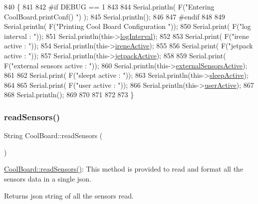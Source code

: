 \begin{DoxyCode}
840 \{
841 
842 \textcolor{preprocessor}{#if DEBUG == 1}
843     
844     Serial.println( F(\textcolor{stringliteral}{"Entering CoolBoard.printConf() "}) );
845     Serial.println();
846 
847 \textcolor{preprocessor}{#endif}
848 
849     Serial.println( F(\textcolor{stringliteral}{"Printing Cool Board Configuration "}));
850     Serial.print( F(\textcolor{stringliteral}{"log interval       : "}));
851     Serial.println(this->\hyperlink{class_cool_board_a84bc94413b64973e4aba8c467c97006c}{logInterval});
852 
853     Serial.print( F(\textcolor{stringliteral}{"irene active       : "}));
854     Serial.println(this->\hyperlink{class_cool_board_a9c3f7ac625481ee2ae802a25d97a4ae0}{ireneActive});
855 
856     Serial.print( F(\textcolor{stringliteral}{"jetpack active     : "}));
857     Serial.println(this->\hyperlink{class_cool_board_a9be03a913d26e558328935ca3b59a75e}{jetpackActive});
858 
859     Serial.print( F(\textcolor{stringliteral}{"external sensors active    : "}));
860     Serial.println(this->\hyperlink{class_cool_board_a638b00b76aeb819ecfd4c10b8cdd7bb7}{externalSensorsActive});
861 
862     Serial.print( F(\textcolor{stringliteral}{"sleept active      : "}));
863     Serial.println(this->\hyperlink{class_cool_board_a0a51b2287139f66c738101fb53139230}{sleepActive});
864 
865     Serial.print( F(\textcolor{stringliteral}{"user active        : "}));
866     Serial.println(this->\hyperlink{class_cool_board_a6395459131d6889a3005f79c7a35e964}{userActive});
867 
868     Serial.println();
869 
870 
871 
872 
873 \}
\end{DoxyCode}
\mbox{\label{class_cool_board_ad03abdce2e65f520bbf2cff0f2d083cf}} 
\subsubsection{\texorpdfstring{read\+Sensors()}{readSensors()}}
{\footnotesize\ttfamily String Cool\+Board\+::read\+Sensors (\begin{DoxyParamCaption}{ }\end{DoxyParamCaption})}

\hyperlink{class_cool_board_ad03abdce2e65f520bbf2cff0f2d083cf}{Cool\+Board\+::read\+Sensors()}\+: This method is provided to read and format all the sensors data in a single json.

\begin{DoxyReturn}{Returns}
json string of all the sensors read. 
\end{DoxyReturn}


